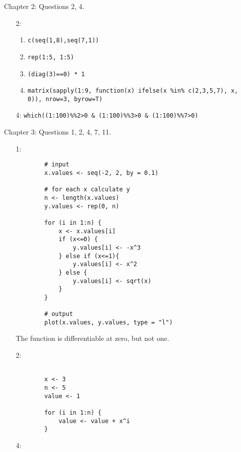 \documentclass[11pt]{exam}
\begin{document}
\begin{questions}
	
\question[7] Chapter 2: Questions 2, 4. 

\begin{enumerate}
	\item[2:]
	
	\begin{enumerate}
		\item \verb!c(seq(1,8),seq(7,1))!
		\item \verb!rep(1:5, 1:5)!
		\item \verb!(diag(3)==0) * 1!
		\item \verb|matrix(sapply(1:9, function(x) ifelse(x %in% c(2,3,5,7), x, 0)), nrow=3, byrow=T)|
		
	\end{enumerate}
	
	
	\item[4:] \verb!which((1:100)%%2>0 & (1:100)%%3>0 & (1:100)%%7>0)!
	
	
\end{enumerate}

\question[12] Chapter 3: Questions 1, 2, 4, 7, 11.

\begin{enumerate}
	\item[1:]
	
	\begin{verbatim}
		# input
		x.values <- seq(-2, 2, by = 0.1)

		# for each x calculate y
		n <- length(x.values)
		y.values <- rep(0, n)

		for (i in 1:n) {
			x <- x.values[i]
			if (x<=0) {
			    y.values[i] <- -x^3
			} else if (x<=1){
			    y.values[i] <- x^2
			} else {
			    y.values[i] <- sqrt(x)
			}
		}

		# output
		plot(x.values, y.values, type = "l")
	\end{verbatim}
	
	The function is differentiable at zero, but not one.
	
	\item[2:] 
	
	\begin{verbatim}
	
		x <- 3
		n <- 5
	    value <- 1

	    for (i in 1:n) {
	        value <- value + x^i
	    }

	\end{verbatim}
	
	\item[4:]
	

\end{enumerate}
\end{questions}
\end{document}
